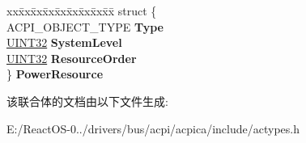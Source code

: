 \begin{DoxyCompactItemize}
\begin{tabbing}
\end{tabbing}\item 
\mbox{\label{unionacpi__object_a247b4757b4a0d32a6fa83eea31a50f35}} 
\begin{tabbing}
xx\=xx\=xx\=xx\=xx\=xx\=xx\=xx\=xx\=\kill
struct \{\\
\>ACPI\_OBJECT\_TYPE {\bfseries Type}\\
\>\hyperlink{_processor_bind_8h_ae1e6edbbc26d6fbc71a90190d0266018}{UINT32} {\bfseries SystemLevel}\\
\>\hyperlink{_processor_bind_8h_ae1e6edbbc26d6fbc71a90190d0266018}{UINT32} {\bfseries ResourceOrder}\\
\} {\bfseries PowerResource}\\

\end{tabbing}\end{DoxyCompactItemize}


该联合体的文档由以下文件生成\+:\begin{DoxyCompactItemize}
\item 
E\+:/\+React\+O\+S-\/0../drivers/bus/acpi/acpica/include/actypes.\+h\end{DoxyCompactItemize}
